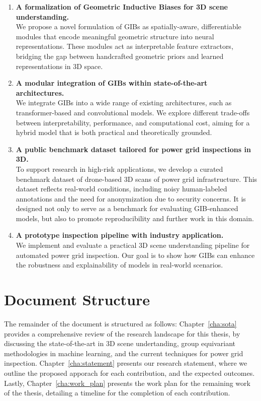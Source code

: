 \begin{enumerate}
    \item \textbf{A formalization of Geometric Inductive Biases
    for 3D scene understanding.} \\
          We propose a novel formulation of GIBs as spatially-aware, 
          differentiable modules that encode meaningful geometric structure
          into neural representations. 
          These modules act as interpretable feature extractors, 
          bridging the gap between handcrafted geometric priors and 
          learned representations in 3D space.

    \item \textbf{A modular integration of GIBs within state-of-the-art architectures.} \\
          We integrate GIBs into a wide range of existing architectures, 
          such as transformer-based and convolutional models. 
          We explore different trade-offs 
          between interpretability, performance, and computational cost,
          aiming for a hybrid model that is both practical 
          and theoretically grounded.

    \item \textbf{A public benchmark dataset tailored for power grid inspections in 3D.} \\
          To support research in high-risk applications, 
          we develop a curated benchmark dataset of drone-based 3D scans of 
          power grid infrastructure. This dataset reflects real-world conditions, 
          including noisy human-labeled annotations and the need for 
          anonymization due to security concerns. 
          It is designed not only to serve as a benchmark for evaluating 
          GIB-enhanced models, but also to promote reproducibility and 
          further work in this domain.

    \item \textbf{A prototype inspection pipeline with industry application.} \\
          We implement and evaluate a practical 3D scene understanding 
          pipeline for automated power grid inspection. 
          Our goal is to show how GIBs can enhance the robustness and explainability
          of models in real-world scenarios.
\end{enumerate}

\section{Document Structure}

The remainder of the document is structured as follows:
%
Chapter~\ref{cha:sota} provides a comprehensive review of the research
landscape for this thesis, by discussing the state-of-the-art in 3D scene
undertanding, group equivariant methodologies in machine learning, and 
the current techniques for power grid inspection.
%
Chapter~\ref{cha:statement} presents our research statement, where
we outline the proposed apporach for each contribution, and the expected
outcomes.
%
Lastly, Chapter~\ref{cha:work_plan} presents the work plan
for the remaining work of the thesis, detailing a timeline for the
completion of each contribution.
